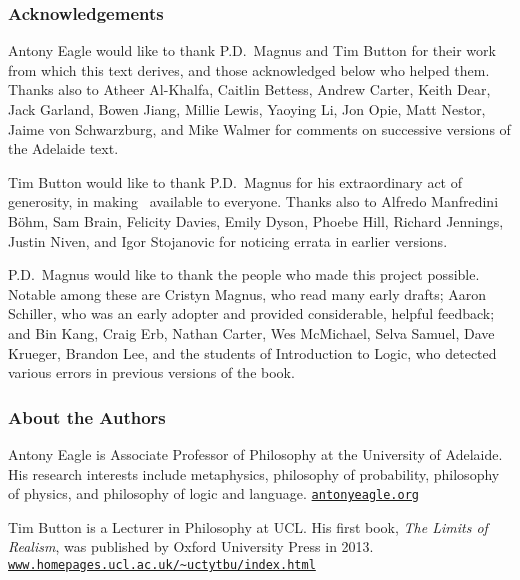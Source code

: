 \thispagestyle{empty}
\onecolumn



\subsubsection*{Acknowledgements}
Antony Eagle would like to thank P.D.\ Magnus and Tim Button for their work from which this text derives, and those acknowledged below who helped them. Thanks also to Atheer Al-Khalfa, Caitlin Bettess, Andrew Carter, Keith Dear, Jack Garland, Bowen Jiang, Millie Lewis, Yaoying Li, Jon Opie, Matt Nestor, Jaime von Schwarzburg, and Mike Walmer for comments on successive versions of the Adelaide text.\medskip

Tim Button would like to thank P.D.\ Magnus for his extraordinary act of generosity, in making \forallx\ available to everyone. Thanks also to Alfredo Manfredini Böhm, Sam Brain, Felicity Davies, Emily Dyson, Phoebe Hill, Richard Jennings, Justin Niven,  and Igor Stojanovic for noticing errata in earlier versions. \medskip

P.D.\ Magnus would like to thank the people who made this project possible. Notable among these are Cristyn Magnus, who read many early drafts; Aaron Schiller, who was an early adopter and provided considerable, helpful feedback; {and} Bin Kang, Craig Erb, Nathan Carter, Wes McMichael, Selva Samuel,  Dave Krueger, Brandon Lee, and the students of Introduction to Logic, who detected various errors in previous versions of the book. 

\subsubsection*{About the Authors}

Antony Eagle is Associate Professor of Philosophy at the University of Adelaide. His research interests include metaphysics, philosophy of probability, philosophy of physics, and philosophy of logic and language. \href{https://antonyeagle.org}{\nolinkurl{antonyeagle.org}}
\medskip


Tim Button is a Lecturer in Philosophy at UCL. His first book, \emph{The Limits of Realism}, was published by Oxford University Press in 2013. \href{http://www.homepages.ucl.ac.uk/~uctytbu/index.html}{\nolinkurl{www.homepages.ucl.ac.uk/~uctytbu/index.html}}
\medskip

